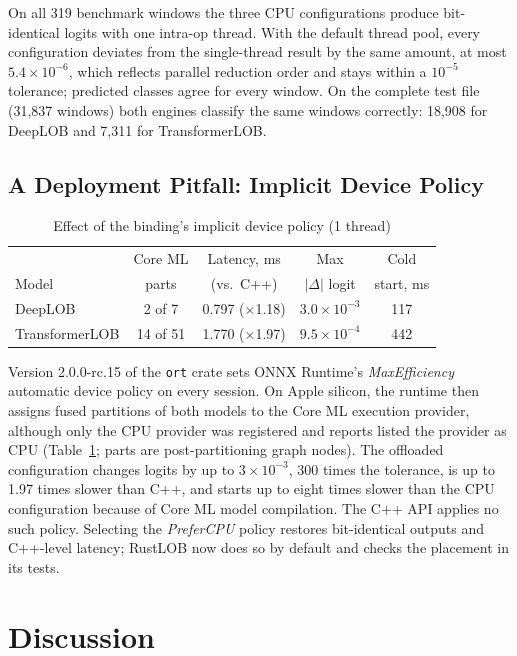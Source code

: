 \documentclass[conference]{IEEEtran}
\begin{document}
On all 319 benchmark windows the three CPU configurations produce bit-identical logits with one intra-op thread. With the default thread pool, every configuration deviates from the single-thread result by the same amount, at most $5.4\times10^{-6}$, which reflects parallel reduction order and stays within a $10^{-5}$ tolerance; predicted classes agree for every window. On the complete test file (31,837 windows) both engines classify the same windows correctly: 18,908 for DeepLOB and 7,311 for TransformerLOB.

\subsection{A Deployment Pitfall: Implicit Device Policy}

\begin{table}[t]
\caption{Effect of the binding's implicit device policy (1 thread)}
\label{tab:coreml}
\centering
\footnotesize
\setlength{\tabcolsep}{3pt}
\begin{tabular}{@{}lcccc@{}}
\toprule
 & Core ML & Latency, ms & Max & Cold \\
Model & parts & (vs.\ C++) & $|\Delta|$ logit & start, ms \\
\midrule
DeepLOB & 2 of 7 & 0.797 ($\times$1.18) & $3.0\times10^{-3}$ & 117 \\
TransformerLOB & 14 of 51 & 1.770 ($\times$1.97) & $9.5\times10^{-4}$ & 442 \\
\bottomrule
\end{tabular}
\end{table}

Version 2.0.0-rc.15 of the \texttt{ort} crate sets ONNX Runtime's \textit{MaxEfficiency} automatic device policy on every session. On Apple silicon, the runtime then assigns fused partitions of both models to the Core ML execution provider, although only the CPU provider was registered and reports listed the provider as CPU (Table~\ref{tab:coreml}; parts are post-partitioning graph nodes). The offloaded configuration changes logits by up to $3\times10^{-3}$, 300 times the tolerance, is up to 1.97 times slower than C++, and starts up to eight times slower than the CPU configuration because of Core ML model compilation. The C++ API applies no such policy. Selecting the \textit{PreferCPU} policy restores bit-identical outputs and C++-level latency; RustLOB now does so by default and checks the placement in its tests.

\section{Discussion}
\end{document}
